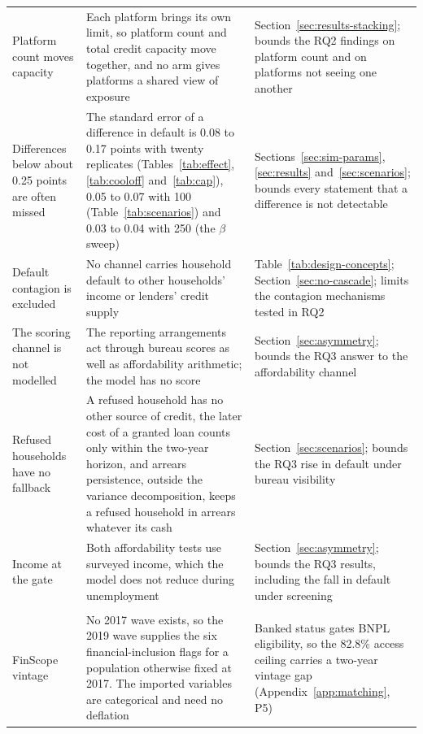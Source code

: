 \begin{longtable}{@{}L{3.1cm}L{6.5cm}L{4.45cm}@{}}
\addlinespace
Platform count moves capacity & Each platform brings its own limit, so platform count and total credit capacity move together, and no arm gives platforms a shared view of exposure & Section~\ref{sec:results-stacking}; bounds the RQ2 findings on platform count and on platforms not seeing one another \\
\addlinespace
Differences below about 0.25 points are often missed & The standard error of a difference in default is 0.08 to 0.17 points with twenty replicates (Tables~\ref{tab:effect}, \ref{tab:cooloff} and~\ref{tab:cap}), 0.05 to 0.07 with 100 (Table~\ref{tab:scenarios}) and 0.03 to 0.04 with 250 (the $\beta$ sweep) & Sections~\ref{sec:sim-params}, \ref{sec:results} and~\ref{sec:scenarios}; bounds every statement that a difference is not detectable \\
\addlinespace
Default contagion is excluded & No channel carries household default to other households' income or lenders' credit supply & Table~\ref{tab:design-concepts}; Section~\ref{sec:no-cascade}; limits the contagion mechanisms tested in RQ2 \\
\addlinespace
The scoring channel is not modelled & The reporting arrangements act through bureau scores as well as affordability arithmetic; the model has no score & Section~\ref{sec:asymmetry}; bounds the RQ3 answer to the affordability channel \\
\addlinespace
Refused households have no fallback & A refused household has no other source of credit, the later cost of a granted loan counts only within the two-year horizon, and arrears persistence, outside the variance decomposition, keeps a refused household in arrears whatever its cash & Section~\ref{sec:scenarios}; bounds the RQ3 rise in default under bureau visibility \\
\addlinespace
Income at the gate & Both affordability tests use surveyed income, which the model does not reduce during unemployment & Section~\ref{sec:asymmetry}; bounds the RQ3 results, including the fall in default under screening \\
\addlinespace
{} \\
\ac{FinScope} vintage & No 2017 wave exists, so the 2019 wave supplies the six
financial-inclusion flags for a population otherwise fixed at 2017. The imported variables are
categorical and need no deflation & Banked status gates \ac{BNPL} eligibility, so the 82.8\%
access ceiling carries a two-year vintage gap (Appendix~\ref{app:matching}, P5) \\

\end{longtable}
